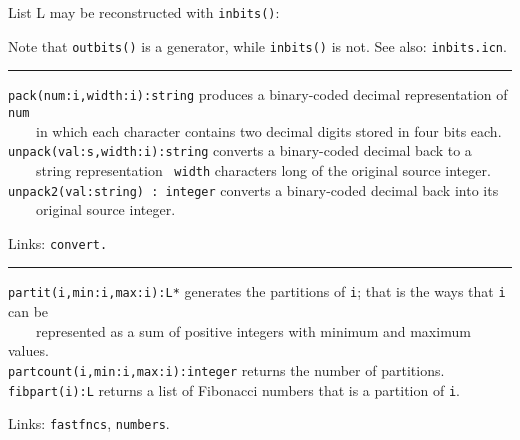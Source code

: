 
List L may be reconstructed with \texttt{inbits()}:


Note that \texttt{outbits()} is a generator, while
\texttt{inbits()} is not.
See also: \texttt{inbits.icn}.

\vspace{0.25cm}\hrule{}

\texttt{pack(num:i,width:i):string} produces a binary-coded decimal
representation of \texttt{num}\\
 \ \ \ \  in which each character contains two decimal
digits stored in four bits each.\\
\texttt{unpack(val:s,width:i):string} converts a binary-coded decimal
back to a\\
 \ \ \ \ string representation \ \texttt{width} characters long of the
original source integer.\\
\texttt{unpack2(val:string) : integer} converts a binary-coded decimal
back into its\\
 \ \ \ \ original source integer.

Links: \texttt{convert.}

\vspace{0.25cm}\hrule{}

\texttt{partit(i,min:i,max:i):L*} generates the partitions of
\texttt{i}; that is the ways that \texttt{i} can be\\
 \ \ \ \ represented as a sum of positive integers with minimum
and maximum values.\\
\texttt{partcount(i,min:i,max:i):integer} returns the number of
partitions.\\
\texttt{fibpart(i):L} returns a list of Fibonacci numbers that is a
partition of \texttt{i}.

Links: \texttt{fastfncs}, \texttt{numbers}. 

